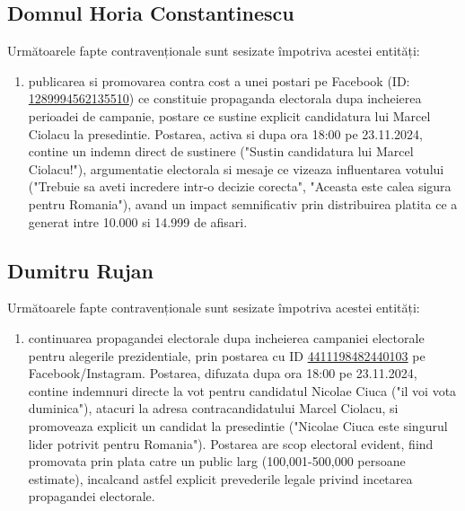 \documentclass[a4paper,12pt]{article}
\begin{document}
\vspace{0.5cm}

\subsection{Domnul Horia Constantinescu}
Următoarele fapte contravenționale sunt sesizate împotriva acestei entități:

\begin{enumerate}[leftmargin=*, label=\arabic*.)]
    \item publicarea si promovarea contra cost a unei postari pe Facebook (ID: \href{https://www.facebook.com/ads/library/?id=1289994562135510}{1289994562135510}) ce constituie propaganda electorala dupa incheierea perioadei de campanie, postare ce sustine explicit candidatura lui Marcel Ciolacu la presedintie. Postarea, activa si dupa ora 18:00 pe 23.11.2024, contine un indemn direct de sustinere ("Sustin candidatura lui Marcel Ciolacu!"), argumentatie electorala si mesaje ce vizeaza influentarea votului ("Trebuie sa aveti incredere intr-o decizie corecta", "Aceasta este calea sigura pentru Romania"), avand un impact semnificativ prin distribuirea platita ce a generat intre 10.000 si 14.999 de afisari.
\end{enumerate}

\vspace{0.5cm}

\subsection{Dumitru Rujan}
Următoarele fapte contravenționale sunt sesizate împotriva acestei entități:

\begin{enumerate}[leftmargin=*, label=\arabic*.)]
    \item continuarea propagandei electorale dupa incheierea campaniei electorale pentru alegerile prezidentiale, prin postarea cu ID \href{https://www.facebook.com/ads/library/?id=4411198482440103}{4411198482440103} pe Facebook/Instagram. Postarea, difuzata dupa ora 18:00 pe 23.11.2024, contine indemnuri directe la vot pentru candidatul Nicolae Ciuca ("il voi vota duminica"), atacuri la adresa contracandidatului Marcel Ciolacu, si promoveaza explicit un candidat la presedintie ("Nicolae Ciuca este singurul lider potrivit pentru Romania"). Postarea are scop electoral evident, fiind promovata prin plata catre un public larg (100,001-500,000 persoane estimate), incalcand astfel explicit prevederile legale privind incetarea propagandei electorale.
\end{enumerate}
\end{document}
